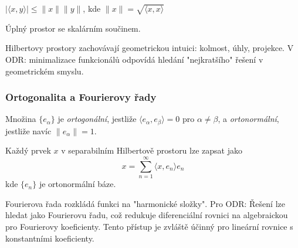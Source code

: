 \begin{theorem}
$|\langle x,y \rangle| \leq \|x\| \|y\|$, kde $\|x\| = \sqrt{\langle x,x \rangle}$
\end{theorem}

\begin{definition}
Úplný prostor se skalárním součinem.
\end{definition}

\begin{intuition}
Hilbertovy prostory zachovávají geometrickou intuici: kolmost, úhly, projekce. V ODR: minimalizace funkcionálů odpovídá hledání "nejkratšího" řešení v geometrickém smyslu.
\end{intuition}

\subsubsection{Ortogonalita a Fourierovy řady}

\begin{definition}
Množina $\{e_\alpha\}$ je \emph{ortogonální}, jestliže $\langle e_\alpha, e_\beta \rangle = 0$ pro $\alpha \neq \beta$, a \emph{ortonormální}, jestliže navíc $\|e_\alpha\| = 1$.
\end{definition}

\begin{theorem}
Každý prvek $x$ v separabilním Hilbertově prostoru lze zapsat jako
\[
x = \sum_{n=1}^\infty \langle x, e_n \rangle e_n
\]
kde $\{e_n\}$ je ortonormální báze.
\end{theorem}

\begin{intuition}
Fourierova řada rozkládá funkci na "harmonické složky". Pro ODR: Řešení lze hledat jako Fourierovu řadu, což redukuje diferenciální rovnici na algebraickou pro Fourierovy koeficienty. Tento přístup je zvláště účinný pro lineární rovnice s konstantními koeficienty.
\end{intuition}

\begin{center}
\end{center}


